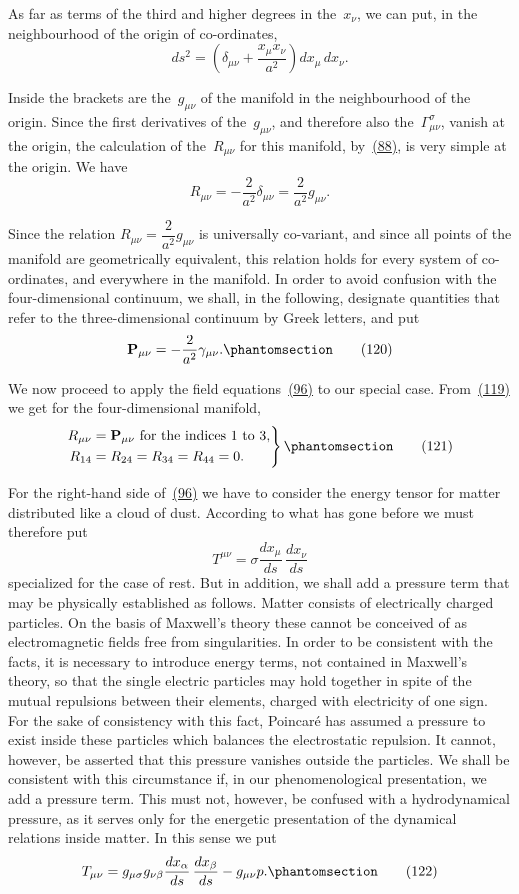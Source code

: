 \documentclass[12pt]{book}[2005/09/16]
\newcommand{\Change}[2]{#2}
\newcommand{\Add}[1]{\Change{}{#1}}
\newcommand{\PageSep}[1]{\ignorespaces}
\newcommand{\Tag}[1]{%
  \phantomsection
  \label{eqn:#1}
  \tag*{#1}
}
\newcommand{\Eqref}[1]{\hyperref[eqn:#1]{#1}}
\newcommand{\Vector}[1]{\mathbf{#1}}
\renewcommand{\P}{\Vector{P}}
\begin{document}
As far as terms of the third and higher degrees in the~$x_{\nu}$,
we can put, in the neighbourhood of the origin of
co-ordinates,
\[
ds^{2} = \left(\delta_{\mu\nu} + \frac{x_{\mu} x_{\nu}}{a^{2}}\right)
  dx_{\mu}\, dx_{\nu}.
\]

Inside the brackets are the~$g_{\mu\nu}$ of the manifold in the
neighbourhood of the origin. Since the first derivatives
of the~$g_{\mu\nu}$, and therefore also the~$\Gamma_{\mu\nu}^{\sigma}$, vanish at the
origin, the calculation of the~$R_{\mu\nu}$ for this manifold, by~\Eqref{(88)},
is very simple at the origin. We have
\[
R_{\mu\nu} = \Change{}{-}\frac{2}{a^{2}} \delta_{\mu\nu}
  = \frac{2}{a^{2}} g_{\mu\nu}.
\]
\PageSep{116}

Since the relation $R_{\mu\nu} = \dfrac{2}{a^{2}} g_{\mu\nu}$ is universally co-variant,
and since all points of the manifold are geometrically
equivalent, this relation holds for every system of co-ordinates,
and everywhere in the manifold. In order to
avoid confusion with the four-dimensional continuum,
we shall, in the following, designate quantities that refer
to the three-dimensional continuum by Greek letters,
and put
\[
\P_{\mu\nu} = -\frac{2}{a^{2}} \gamma_{\mu\nu}\Add{.}
\Tag{(120)}
\]

We now proceed to apply the field equations~\Eqref{(96)} to
our special case. From~\Eqref{(119)} we get for the four-dimensional
manifold,
\[
\left.
\begin{aligned}
R_{\mu\nu} &= \text{$\P_{\mu\nu}$ for the indices~$1$ to~$3$}\Add{,} \\
R_{14} &= R_{24} = R_{34} = R_{44} = 0\Add{.}
\end{aligned}
\right\}
\Tag{(121)}
\]

For the right-hand side of~\Eqref{(96)} we have to consider
the energy tensor for matter distributed like a cloud of
dust. According to what has gone before we must
therefore put
\[
T^{\mu\nu} = \sigma \frac{dx_{\mu}}{ds}\, \frac{dx_{\nu}}{ds}
\]
specialized for the case of rest. But in addition, we
shall add a pressure term that may be physically established
as follows. Matter consists of electrically charged
particles. On the basis of Maxwell's theory these
cannot be conceived of as electromagnetic fields free
from singularities. In order to be consistent with the
\PageSep{117}
facts, it is necessary to introduce energy terms, not contained
in Maxwell's theory, so that the single electric
particles may hold together in spite of the mutual repulsions
between their elements, charged with electricity
of one sign. For the sake of consistency with this fact,
Poincaré has assumed a pressure to exist inside these
particles which balances the electrostatic repulsion. It
cannot, however, be asserted that this pressure vanishes
outside the particles. We shall be consistent with this
circumstance if, in our phenomenological presentation,
we add a pressure term. This must not, however, be
confused with a hydrodynamical pressure, as it serves
only for the energetic presentation of the dynamical
relations inside matter. In this sense we put
\[
T_{\mu\nu}
  = g_{\mu\sigma} g_{\nu\beta} \frac{dx_{\alpha}}{ds}\, \frac{dx_{\beta}}{ds}
  - g_{\mu\nu} p\Add{.}
\Tag{(122)}
\]
\end{document}
